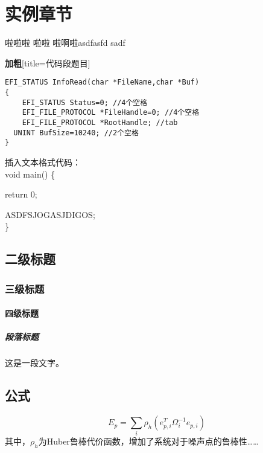 \chapter{实例章节}
\label{cha:introduction}

啦\cite{zhengkaiqing1987,xiaoyu2001chubanye}啦啦
\cite{zhukezhen1973}啦\cite{jianduju1994}啦\cite{biaozhunhua2002tushu}
啦\cite{baishunong1998zhiwu}啊\cite{scitor2000project}啦\cite{jiangxizhou1980}asdfasfd
sadf\cite{chineses34}
\par \textbf{加粗}[title=代码段题目]

\begin{lstlisting}
EFI_STATUS InfoRead(char *FileName,char *Buf)
{
    EFI_STATUS Status=0; //4个空格
    EFI_FILE_PROTOCOL *FileHandle=0; //4个空格
	EFI_FILE_PROTOCOL *RootHandle; //tab
  UNINT BufSize=10240; //2个空格
}
\end{lstlisting}

插入文本格式代码：
\\ void main() \{
\par return 0;
\par ASDFSJOGASJDIGOS;
\\ \}
\section{二级标题}

\subsection{三级标题}

\subsubsection{四级标题}

\paragraph{段落标题}

这是一段文字。

\section{公式}
\label{sec:equation}

\begin{equation}
\label{eq:error}
	E_p=\sum_i\rho_h(e_{p,i}^T\Omega_i^{-1}e_{p,i})
\end{equation}
其中，$\rho_h$为Huber鲁棒代价函数，增加了系统对于噪声点的鲁棒性……

